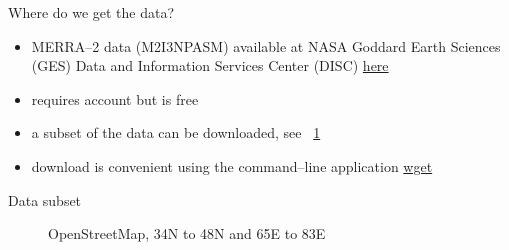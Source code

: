 \documentclass[
    hyperref={
        final,
        colorlinks=true,
        menucolor=black,
        anchorcolor=green,
        linkcolor=blue,
        citecolor=red,
        pdftitle={RS RAS Internship Presentation},
        pdfauthor={Moritz M. Konarski}
    }
]{beamer}
\newcommand{\figref}[1]{\figurename~\ref{#1}}
\begin{document}
\begin{frame}[fragile]{Where do we get the data?}
    \begin{itemize}
        \item MERRA--2 data (M2I3NPASM) available at NASA Goddard Earth 
            Sciences (GES) Data and Information Services Center (DISC)
    \href{https://disc.gsfc.nasa.gov/datasets/M2I3NPASM_5.12.4/summary}{here}
        \item requires account \cite{earthdata-policy} but is free 
            \cite{esds-website}
        \item a subset of the data can be downloaded, see \figref{map}
        \item download is convenient using the command--line application 
        \href{https://disc.gsfc.nasa.gov/data-access#mac_linux_wget}{wget}
    \end{itemize}
\end{frame}


\begin{frame}{Data subset}
    \begin{figure}[H]
        \center
        \caption{OpenStreetMap, 34\textdegree{}N to 48\textdegree{}N and 
            65\textdegree{}E to 83\textdegree{}E}
        \label{map}
    \end{figure}
\end{frame}
\end{document}
